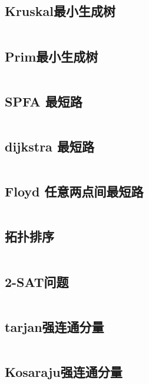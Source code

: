 \inputminted{cpp}{code/union-find(undo).cc}

\subsection{Kruskal最小生成树} 

\inputminted{cpp}{code/Kruskal.cc}

\subsection{Prim最小生成树} 

\inputminted{cpp}{code/MST_Prim.cc}

\subsection{SPFA 最短路} 

\inputminted{cpp}{code/SPFA.cc}

\subsection{dijkstra 最短路} 

\inputminted{cpp}{code/dijkstra.cc}

\subsection{Floyd 任意两点间最短路} 

\inputminted{cpp}{code/Floyd.cc}

\subsection{拓扑排序} 

\inputminted{cpp}{code/拓扑排序.cc}

\subsection{2-SAT问题} 

\inputminted{cpp}{code/TwoSAT.cc}

\subsection{tarjan强连通分量} 

\inputminted{cpp}{code/tarjan.cc}

\subsection{Kosaraju强连通分量} 

